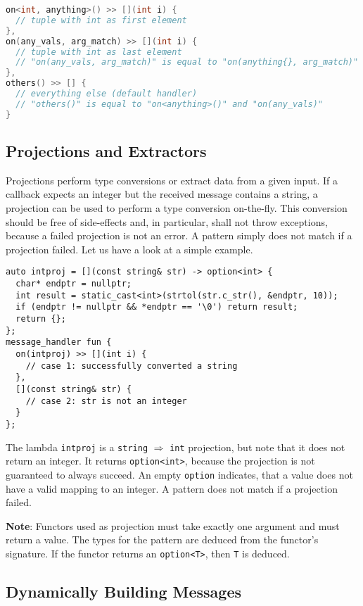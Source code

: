 \begin{lstlisting}[language=C++]
on<int, anything>() >> [](int i) {
  // tuple with int as first element
},
on(any_vals, arg_match) >> [](int i) {
  // tuple with int as last element
  // "on(any_vals, arg_match)" is equal to "on(anything{}, arg_match)"
},
others() >> [] {
  // everything else (default handler)
  // "others()" is equal to "on<anything>()" and "on(any_vals)"
}
\end{lstlisting}

\subsection{Projections and Extractors}

Projections perform type conversions or extract data from a given input.
If a callback expects an integer but the received message contains a string, a projection can be used to perform a type conversion on-the-fly.
This conversion should be free of side-effects and, in particular, shall not throw exceptions, because a failed projection is not an error.
A pattern simply does not match if a projection failed.
Let us have a look at a simple example.

\begin{lstlisting}
auto intproj = [](const string& str) -> option<int> {
  char* endptr = nullptr;
  int result = static_cast<int>(strtol(str.c_str(), &endptr, 10));
  if (endptr != nullptr && *endptr == '\0') return result;
  return {};
};
message_handler fun {
  on(intproj) >> [](int i) {
    // case 1: successfully converted a string
  },
  [](const string& str) {
    // case 2: str is not an integer
  }
};
\end{lstlisting}

The lambda \lstinline^intproj^ is a \lstinline^string^ $\Rightarrow$ \lstinline^int^ projection, but note that it does not return an integer.
It returns \lstinline^option<int>^, because the projection is not guaranteed to always succeed.
An empty \lstinline^option^ indicates, that a value does not have a valid mapping to an integer.
A pattern does not match if a projection failed.

\textbf{Note}: Functors used as projection must take exactly one argument and must return a value.
The types for the pattern are deduced from the functor's signature.
If the functor returns an \lstinline^option<T>^, then \lstinline^T^ is deduced.

\subsection{Dynamically Building Messages}

